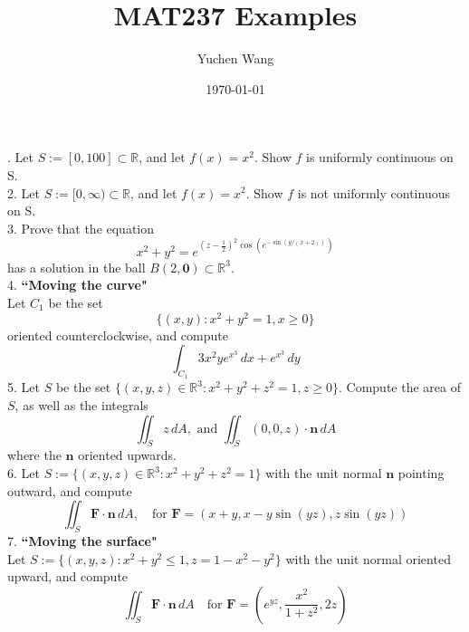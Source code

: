 \documentclass[11pt]{article}
\title{MAT237 Examples}
\author{Yuchen Wang}
\date{\today}
\newcommand{\tb}[1]{\textbf{#1}}
\newcommand{\real}[0]{\mathbb{R}}
\newcommand{\vo}[0]{\tb{0}}
\newcommand{\vf}[0]{\tb{F}}
\newcommand{\vn}[0]{\tb{n}}
\begin{document}
    \maketitle
{}. Let $S:= [0, 100] \subset \real$, and let $f(x) = x^2$. Show $f$ is uniformly continuous on S. \\
2. Let $S:= [0, \infty) \subset \real$, and let $f(x) = x^2$. Show $f$ is not uniformly continuous on S. \\
3. Prove that the equation $$x^2 + y^2 = e^{(z-\frac{1}{2})^2 \cos(e^{-\sin(y/(x+2))})}$$
has a solution in the ball $B(2, \vo) \subset \real^3$. \\
4. \tb{``Moving the curve"} \\
Let $C_1$ be the set $$\{(x,y): x^2+y^2 = 1, x \geq 0\}$$ oriented counterclockwise, and compute
$$\int_{C_1} 3x^2ye^{x^3}\,dx + e^{x^3}\,dy$$
5. Let $S$ be the set $\{(x,y,z) \in \real^3: x^2 + y^2 + z^2 = 1, z \geq 0\}$. Compute the area of $S$, as well as the integrals
$$\iint_S z \, dA, \mbox{ and }\iint_S (0,0,z) \cdot \vn\, dA$$
where the $\vn$ oriented upwards. \\
6. Let $S:= \{(x,y,z) \in \real^3: x^2 + y^2 + z^2 = 1\}$ with the unit normal $\vn$ pointing outward, and compute
$$\iint_S \vf \cdot \vn \, dA, \quad \mbox{for } \vf = (x+y, x-y\sin(yz), z\sin(yz))$$
7. \tb{``Moving the surface"}\\
Let $S:= \{(x,y,z): x^2 + y^2 \leq 1, z = 1 - x^2 - y^2\}$ with the unit normal oriented upward, and compute
$$\iint_S \vf \cdot \vn \, dA \quad \mbox{for } \vf = (e^{yz}, \frac{x^2}{1+z^2}, 2z)$$
\end{document}

